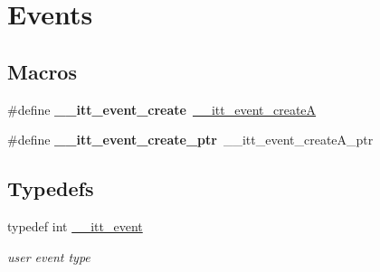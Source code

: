 \hypertarget{group__legacy__events}{}\section{Events}
\label{group__legacy__events}
\subsection*{Macros}
\begin{DoxyCompactItemize}
\item 
\hypertarget{group__legacy__events_ga6047262ecd47411ed590bd073f9e4da0}{}\#define {\bfseries \+\_\+\+\_\+itt\+\_\+event\+\_\+create}~\hyperlink{group__legacy__events_ga6de94d8c80ce1289fc90a4d4154e4538}{\+\_\+\+\_\+itt\+\_\+event\+\_\+create\+A}\label{group__legacy__events_ga6047262ecd47411ed590bd073f9e4da0}

\item 
\hypertarget{group__legacy__events_ga89cc719b31bd37bcb563754a9c9e7f8d}{}\#define {\bfseries \+\_\+\+\_\+itt\+\_\+event\+\_\+create\+\_\+ptr}~\+\_\+\+\_\+itt\+\_\+event\+\_\+create\+A\+\_\+ptr\label{group__legacy__events_ga89cc719b31bd37bcb563754a9c9e7f8d}

\end{DoxyCompactItemize}
\subsection*{Typedefs}
\begin{DoxyCompactItemize}
\item 
\hypertarget{group__legacy__events_gaf3abb988e507916595fa4a13f5a524e4}{}typedef int \hyperlink{group__legacy__events_gaf3abb988e507916595fa4a13f5a524e4}{\+\_\+\+\_\+itt\+\_\+event}\label{group__legacy__events_gaf3abb988e507916595fa4a13f5a524e4}

\begin{DoxyCompactList}\small\item\em user event type \end{DoxyCompactList}\end{DoxyCompactItemize}
